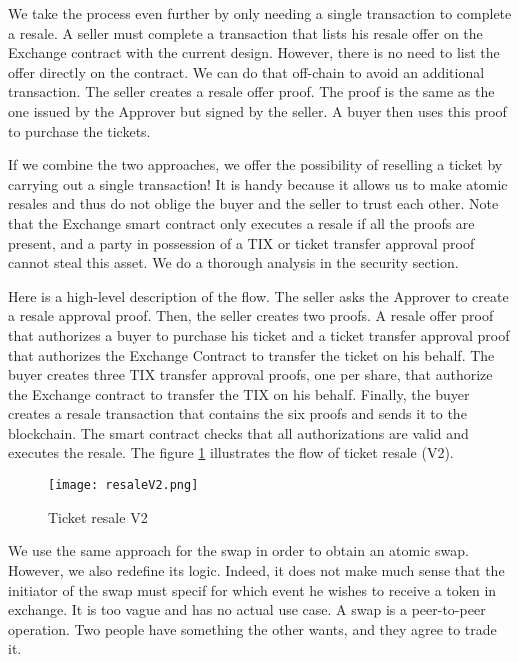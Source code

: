 \documentclass[a4paper,11pt,oneside]{report}
\begin{document}
We take the process even further by only needing a single transaction to complete a resale. A seller must complete a transaction that lists his resale offer on the Exchange contract with the current design. However, there is no need to list the offer directly on the contract. We can do that off-chain to avoid an additional transaction. The seller creates a resale offer proof. The proof is the same as the one issued by the Approver but signed by the seller. A buyer then uses this proof to purchase the tickets.

If we combine the two approaches, we offer the possibility of reselling a ticket by carrying out a single transaction! It is handy because it allows us to make atomic resales and thus do not oblige the buyer and the seller to trust each other. Note that the Exchange smart contract only executes a resale if all the proofs are present, and a party in possession of a TIX or ticket transfer approval proof cannot steal this asset. We do a thorough analysis in the security section.

Here is a high-level description of the flow. The seller asks the Approver to create a resale approval proof. Then, the seller creates two proofs. A resale offer proof that authorizes a buyer to purchase his ticket and a ticket transfer approval proof that authorizes the Exchange Contract to transfer the ticket on his behalf. The buyer creates three TIX transfer approval proofs, one per share, that authorize the Exchange contract to transfer the TIX on his behalf. Finally, the buyer creates a resale transaction that contains the six proofs and sends it to the blockchain. The smart contract checks that all authorizations are valid and executes the resale. The figure \hyperref[fig:resaleV2]{\ref{fig:resaleV2}} illustrates the flow of ticket resale (V2).

\begin{figure}[h!]
  \texttt{[image: resaleV2.png]}
  \caption{Ticket resale V2}
  \label{fig:resaleV2}
\end{figure}

We use the same approach for the swap in order to obtain an atomic swap. However, we also redefine its logic. Indeed, it does not make much sense that the initiator of the swap must specif for which event he wishes to receive a token in exchange. It is too vague and has no actual use case. A swap is a peer-to-peer operation. Two people have something the other wants, and they agree to trade it. 
\end{document}

